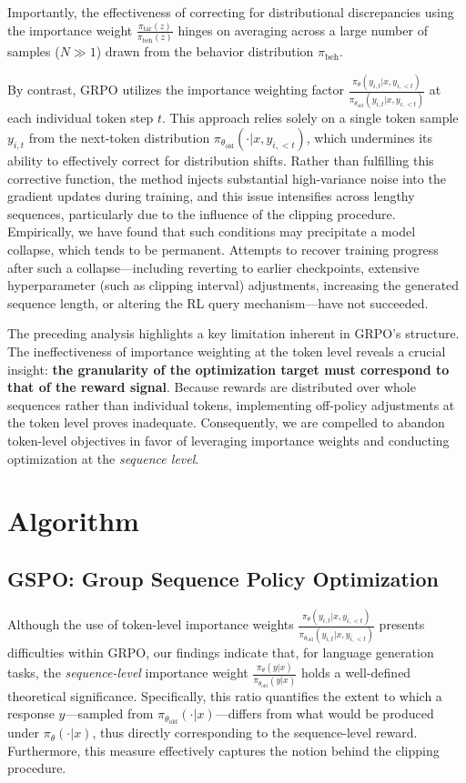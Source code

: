 Importantly, the effectiveness of correcting for distributional discrepancies using the importance weight $\frac{ \pi_\text{tar} (z) }{ \pi_\text{beh} (z)}$ hinges on averaging across a large number of samples ($N \gg 1$) drawn from the behavior distribution $\pi_\text{beh}$.

By contrast, GRPO utilizes the importance weighting factor $\frac{ \pi_{\theta} (y_{i,t} | x, y_{i,<t}) }{ \pi_{\theta_\text{old}} (y_{i,t} | x,y_{i,<t})}$ at each individual token step $t$. This approach relies solely on a single token sample $y_{i,t}$ from the next-token distribution $\pi_{\theta_\text{old}}( \cdot | x, y_{i, <t})$, which undermines its ability to effectively correct for distribution shifts. Rather than fulfilling this corrective function, the method injects substantial high-variance noise into the gradient updates during training, and this issue intensifies across lengthy sequences, particularly due to the influence of the clipping procedure. Empirically, we have found that such conditions may precipitate a model collapse, which tends to be permanent. Attempts to recover training progress after such a collapse—including reverting to earlier checkpoints, extensive hyperparameter (such as clipping interval) adjustments, increasing the generated sequence length, or altering the RL query mechanism—have not succeeded.

The preceding analysis highlights a key limitation inherent in GRPO's structure. The ineffectiveness of importance weighting at the token level reveals a crucial insight: \textbf{the granularity of the optimization target must correspond to that of the reward signal}. Because rewards are distributed over whole sequences rather than individual tokens, implementing off-policy adjustments at the token level proves inadequate. Consequently, we are compelled to abandon token-level objectives in favor of leveraging importance weights and conducting optimization at the \textit{sequence level}.

\section{Algorithm}

\subsection{GSPO: Group Sequence Policy Optimization}

Although the use of token-level importance weights $\frac{ \pi_{\theta} (y_{i,t} | x, y_{i,<t}) }{ \pi_{\theta_\text{old}} (y_{i,t} | x,y_{i,<t})}$ presents difficulties within GRPO, our findings indicate that, for language generation tasks, the \textit{sequence-level} importance weight $\frac{ \pi_{\theta} (y | x) }{ \pi_{\theta_\text{old}} (y | x)}$ holds a well-defined theoretical significance. Specifically, this ratio quantifies the extent to which a response $y$—sampled from $\pi_{\theta_\text{old}} (\cdot | x)$—differs from what would be produced under $\pi_{\theta} (\cdot | x)$, thus directly corresponding to the sequence-level reward. Furthermore, this measure effectively captures the notion behind the clipping procedure.

